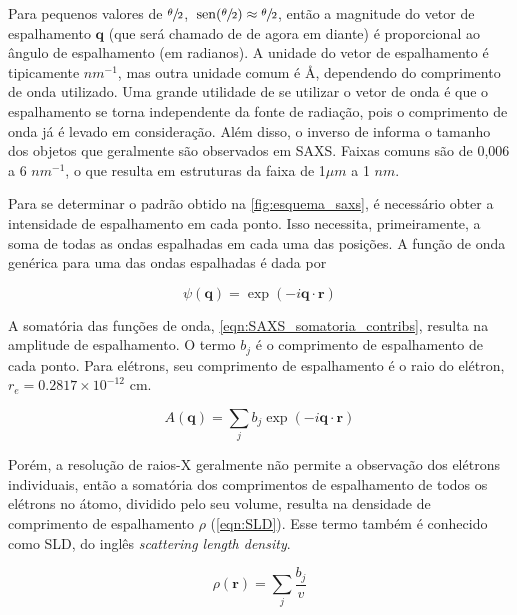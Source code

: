 		Para pequenos valores de \(\sfrac{\theta}{2}\), \(\hspace{2pt}\mathrm{sen}(\sfrac{\theta}{2}) \approx \sfrac{\theta}{2}\), então a magnitude do vetor de espalhamento \(\mathbf{q}\) (que será chamado de \q{} de agora em diante) é proporcional ao ângulo de espalhamento (em radianos).\cite{Glatter2018livro} A unidade do vetor de espalhamento é tipicamente \(nm^{-1}\), mas outra unidade comum é \AA\menosUm, dependendo do comprimento de onda utilizado. Uma grande utilidade de se utilizar o vetor de onda é que o espalhamento se torna independente da fonte de radiação, pois o comprimento de onda já é levado em consideração. Além disso, o inverso de \q{} informa o tamanho dos objetos que geralmente são observados em SAXS. Faixas comuns são de 0,006 a 6 \(nm^{-1}\), o que resulta em estruturas da faixa de 1\(\mu m\) a 1 \(nm\).\cite{Narayanan2008a}

		Para se determinar o padrão obtido na \autoref{fig:esquema_saxs}, é necessário obter a intensidade de espalhamento em cada ponto. Isso necessita, primeiramente, a soma de todas as ondas espalhadas em cada uma das posições. A função de onda genérica para uma das ondas espalhadas é dada por\cite{Pedersen_Aula1}
		
		\begin{equation}
			\psi(\mathbf{q}) = \exp(-i \mathbf{q} \cdot \mathbf{r})
			\label{eqn:funcao_onda_espalhamento}
		\end{equation}
				
		A somatória das funções de onda, \autoref{eqn:SAXS_somatoria_contribs}, resulta na amplitude de espalhamento. \cite{Pedersen_Aula1} O termo \(b_j\) é o comprimento de espalhamento de cada ponto. Para elétrons, seu comprimento de espalhamento é o raio do elétron, \(r_e = 0.2817 \times 10^{-12}\) cm.
		
		\begin{equation}
			A(\mathbf{q}) = \sum_j b_j \exp(-i \mathbf{q} \cdot \mathbf{r})
			\label{eqn:SAXS_somatoria_contribs}
		\end{equation}
		
		Porém, a resolução de raios-X geralmente não permite a observação dos elétrons individuais, então a somatória dos comprimentos de espalhamento de todos os elétrons no átomo, dividido pelo seu volume, resulta na densidade de comprimento de espalhamento \(\rho\) (\autoref{eqn:SLD}). Esse termo também é conhecido como SLD, do inglês \emph{scattering length density}.\cite{Pedersen_Aula1}
		
		\begin{equation}
			\rho(\mathbf{r}) = \sum_j \dfrac{b_j}{v}
			\label{eqn:SLD}
		\end{equation} 
		
